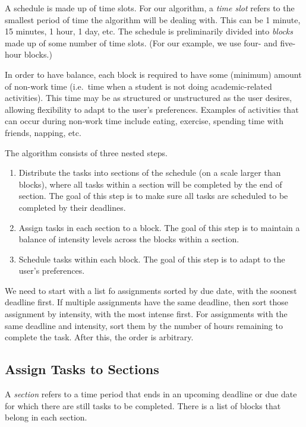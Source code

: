 \documentclass{article}
\begin{document}
	A schedule is made up of time slots. For our algorithm, a \emph{time slot} refers to the smallest period of time the algorithm will be dealing with. This can be 1 minute, 15 minutes, 1 hour, 1 day, etc.
	The schedule is preliminarily divided into \emph{blocks} made up of some number of time slots.
	(For our example, we use four- and five-hour blocks.)
	
	In order to have balance, each block is required to have some (minimum) amount of non-work time (i.e.~time when a student is not doing academic-related activities). 
	This time may be as structured or unstructured as the user desires, allowing flexibility to adapt to the user's preferences.
	Examples of activities that can occur during non-work time include eating, exercise, spending time with friends, napping, etc.

	The algorithm consists of three nested steps.
	\begin{enumerate}
		\item Distribute the tasks into sections of the schedule (on a scale larger than blocks), where all tasks within a section will be completed by the end of section. The goal of this step is to make sure all tasks are scheduled to be completed by their deadlines.
		\item Assign tasks in each section to a block. The goal of this step is to maintain a balance of intensity levels across the blocks within a section.
		\item Schedule tasks within each block. The goal of this step is to adapt to the user's preferences.
	\end{enumerate}
	
	We need to start with a list fo assignments sorted by due date, with the soonest deadline first.
	If multiple assignments have the same deadline, then sort those assignment by intensity, with the most intense first.
	For assignments with the same deadline and intensity, sort them by the number of hours remaining to complete the task.
	After this, the order is arbitrary.

	\subsection{Assign Tasks to Sections}
		A \textit{section} refers to a time period that ends in an upcoming deadline or due date for which there are still tasks to be completed.
		There is a list of blocks that belong in each section.
		
\end{document}
